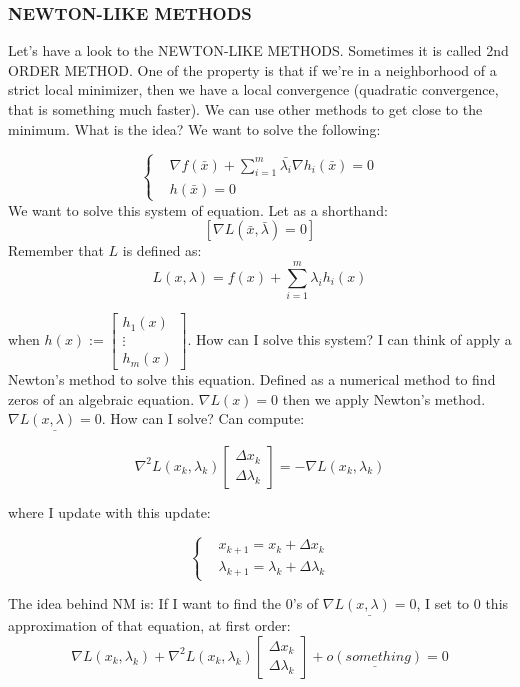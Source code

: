\subsubsection{NEWTON-LIKE METHODS}


Let's have a look to the NEWTON-LIKE METHODS. Sometimes it is called 2nd ORDER METHOD. One of the property is that if we're in a neighborhood of a strict local minimizer, then we have a local convergence (quadratic convergence, that is something much faster). We can use other methods to get close to the minimum. What is the idea? We want to solve the following: 

\[
	\left\{
	\begin{aligned}
	&\nabla{f(\bar{x})} + \sum_{i=1}^m{\bar{\lambda_i}\nabla{h_i(\bar{x})}} = 0\\
	&h(\bar{x}) = 0
	\end{aligned}
	\right.
\]
We want to solve this system of equation. Let as a shorthand:
\[
	[\nabla{L(\bar{x},\bar{\lambda})} = 0]
\]
Remember that $L$ is defined as:
\[
	L(x,\lambda) = f(x) + \sum_{i=1}^m{\lambda_ih_i(x)}
\]

when $h(x) := \begin{bmatrix}h_1(x)\\ \vdots\\h_m(x)\end{bmatrix}$. How can I solve this system? I can think of apply a Newton's method to solve this equation. Defined as a numerical method to find zeros of an algebraic equation. $\nabla{L(x)}=0$ then we apply Newton's method. $\underline{\nabla{L(x,\lambda)} =0}$. How can I solve? Can compute:

\[
	\nabla^2{L(x_k,\lambda_k)}\begin{bmatrix}\Delta x_k\\ \Delta\lambda_k\end{bmatrix} = -\nabla{L(x_k,\lambda_k)}
\]

where I update with this update:

\[	
	\left\{
	\begin{aligned}
	&x_{k+1} = x_k + \Delta x_k\\
	&\lambda_{k+1} = \lambda_k + \Delta\lambda_k
	\end{aligned}
	\right.
\]

The idea behind NM is: If I want to find the 0's of $\underline{\nabla{L(x,\lambda)} = 0}$, I set to 0 this approximation of that equation, at first order:
\[
	\nabla{L(x_k,\lambda_k)} + \nabla^2{L(x_k,\lambda_k)}\begin{bmatrix}\Delta x_k\\ \Delta\lambda_k\end{bmatrix} + \underline{o(something)} = 0
\]

